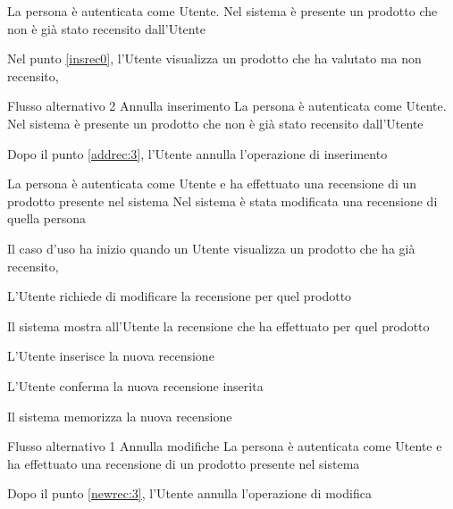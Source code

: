 {La persona è autenticata come Utente. Nel sistema è presente un prodotto che non è già stato recensito dall'Utente}%
{\postNulle}%
{\begin{enumCU}
		\item Nel punto \ref{insrec0}, l'Utente visualizza un prodotto che ha valutato ma non recensito, 
	\end{enumCU}}%
%
{Flusso alternativo 2}%
{Annulla inserimento}%
{La persona è autenticata come Utente. Nel sistema è presente un prodotto che non è già stato recensito dall'Utente}%
{\postNulle}%
{\begin{enumCU}
		\item Dopo il punto \ref{addrec:3}, l'Utente annulla l'operazione di inserimento
	\end{enumCU}}%

\tabcuvspace

{}
{La persona è autenticata come Utente e ha effettuato una recensione di un prodotto presente nel sistema}
{Nel sistema è stata modificata una recensione di quella persona}
{\begin{enumCU}
	\item Il caso d'uso ha inizio quando un Utente visualizza un prodotto che ha già recensito, 
	\item L'Utente richiede di modificare la recensione per quel prodotto
	\item Il sistema mostra all'Utente la recensione che ha effettuato per quel prodotto
	\item L'Utente inserisce la nuova recensione \label{newrec:3}
	\item L'Utente conferma la nuova recensione inserita
	\item Il sistema memorizza la nuova recensione
\end{enumCU}}
%
{Flusso alternativo 1}%
{Annulla modifiche}%
{La persona è autenticata come Utente e ha effettuato una recensione di un prodotto presente nel sistema}
{\postNulle}%
{\begin{enumCU}
		\item Dopo il punto \ref{newrec:3}, l'Utente annulla l'operazione di modifica
	\end{enumCU}}%

\tabcuvspace

